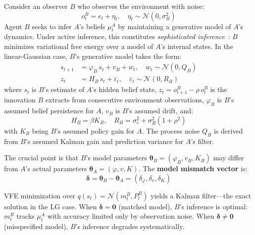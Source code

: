 \documentclass[runningheads]{llncs}
\begin{document}
Consider an observer $B$ who observes the environment with noise:
\begin{equation}
    o^B_t = e_t + \eta_t, \quad \eta_t \sim \mathcal{N}(0, \sigma_B^2)
    \label{eq:obs_B}
\end{equation}
Agent $B$ seeks to infer $A$'s beliefs $\mu^A_t$ by maintaining a generative model of $A$'s dynamics. Under active inference, this constitutes \emph{sophisticated inference}~\cite{friston2015duet}: $B$ minimizes variational free energy over a model of $A$'s internal states. In the linear-Gaussian case, $B$'s generative model takes the form:
\begin{align}
    s_{t+1} &= \varphi_B \, s_t + v_B + w_t, \quad w_t \sim \mathcal{N}(0, Q_B) \label{eq:tom_B_transition} \\
    z_t &= H_B \, s_t + \varepsilon_t, \quad \varepsilon_t \sim \mathcal{N}(0, R_B) \label{eq:tom_B_observation}
\end{align}
where $s_t$ is $B$'s estimate of $A$'s hidden belief state, $z_t = o^B_{t+1} - \rho \, o^B_t$ is the innovation $B$ extracts from consecutive environment observations, $\varphi_B$ is $B$'s assumed belief persistence for $A$, $v_B$ is $B$'s assumed drift, and:
\begin{equation}
    H_B = \beta K_B, \quad R_B = \sigma_e^2 + \sigma_B^2(1 + \rho^2)
    \label{eq:H_B}
\end{equation}
with $K_B$ being $B$'s assumed policy gain for $A$. The process noise $Q_B$ is derived from $B$'s assumed Kalman gain and prediction variance for $A$'s filter.

The crucial point is that $B$'s model parameters $\boldsymbol{\theta}_B = (\varphi_B, v_B, K_B)$ may differ from $A$'s actual parameters $\boldsymbol{\theta}_A = (\varphi, v, K)$. The \textbf{model mismatch vector} is:
\begin{equation}
    \boldsymbol{\delta} = \boldsymbol{\theta}_B - \boldsymbol{\theta}_A = (\delta_\varphi, \delta_v, \delta_K)
    \label{eq:mismatch}
\end{equation}

VFE minimization over $q(s_t) = \mathcal{N}(m^B_t, P^B_t)$ yields a Kalman filter---the exact solution in the LG case. When $\boldsymbol{\delta} = \mathbf{0}$ (matched model), $B$'s inference is optimal: $m^B_t$ tracks $\mu^A_t$ with accuracy limited only by observation noise. When $\boldsymbol{\delta} \neq \mathbf{0}$ (misspecified model), $B$'s inference degrades systematically.
\end{document}
